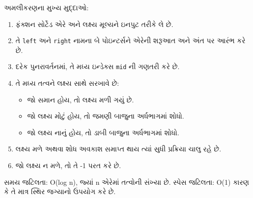 \begin{Shaded}
\begin{Highlighting}[]
\OperatorTok{!=} \OperatorTok{{-}}\NormalTok{:}
    \NormalTok{(}\SpecialCharTok{\{}\SpecialCharTok{\}}\SpecialCharTok{\{}\SpecialCharTok{\}}\NormalTok{)}
\NormalTok{:}
    \NormalTok{(}\SpecialCharTok{\{}\SpecialCharTok{\}}\NormalTok{)}
\end{Highlighting}
\end{Shaded}

અમલીકરણના મુખ્ય મુદ્દાઓ:

\begin{enumerate}
\def\labelenumi{\arabic{enumi}.}
\tightlist
\item
  ફંક્શન સોર્ટેડ એરે અને લક્ષ્ય મૂલ્યને ઇનપુટ તરીકે લે છે.
\item
  તે \texttt{left} અને \texttt{right} નામના બે પોઇન્ટર્સને એરેની શરૂઆત અને અંત પર
  આરંભ કરે છે.
\item
  દરેક પુનરાવર્તનમાં, તે મધ્ય ઇન્ડેક્સ \texttt{mid} ની ગણતરી કરે છે.
\item
  તે મધ્ય તત્વને લક્ષ્ય સાથે સરખાવે છે:

  \begin{itemize}
  \tightlist
  \item
    જો સમાન હોય, તો લક્ષ્ય મળી ગયું છે.
  \item
    જો લક્ષ્ય મોટું હોય, તો જમણી બાજુના અર્ધભાગમાં શોધો.
  \item
    જો લક્ષ્ય નાનું હોય, તો ડાબી બાજુના અર્ધભાગમાં શોધો.
  \end{itemize}
\item
  લક્ષ્ય મળે અથવા શોધ અવકાશ સમાપ્ત થાય ત્યાં સુધી પ્રક્રિયા ચાલુ રહે છે.
\item
  જો લક્ષ્ય ન મળે, તો તે -1 પરત કરે છે.
\end{enumerate}

સમય જટિલતા: O(log n), જ્યાં n એરેમાં તત્વોની સંખ્યા છે. સ્પેસ જટિલતા: O(1) કારણ કે
તે માત્ર સ્થિર જગ્યાનો ઉપયોગ કરે છે.

\begin{Shaded}
\begin{Highlighting}[]
\end{Highlighting}
\end{Shaded}


